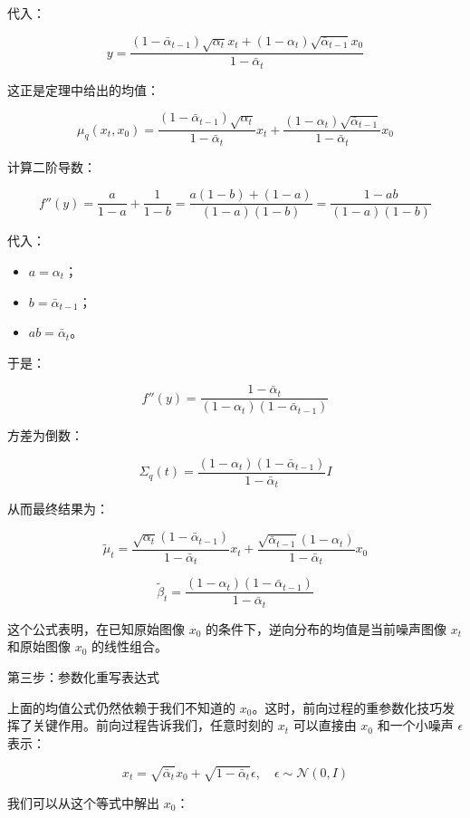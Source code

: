 代入：

\[
y=\frac{(1-\bar{\alpha}_{t-1})\sqrt{\alpha_t}x_t+(1-\alpha_t)\sqrt{\bar{\alpha}_{t-1}}x_0}{1-\bar{\alpha}_t}
\]

这正是定理中给出的均值：

\[
\mu_q(x_t,x_0)=
\frac{(1-\bar{\alpha}_{t-1})\sqrt{\alpha_t}}{1-\bar{\alpha}_t}x_t
+\frac{(1-\alpha_t)\sqrt{\bar{\alpha}_{t-1}}}{1-\bar{\alpha}_t}x_0
\]

计算二阶导数：

\[
f''(y)=\frac{a}{1-a}+\frac{1}{1-b}
=\frac{a(1-b)+(1-a)}{(1-a)(1-b)}
=\frac{1-ab}{(1-a)(1-b)}
\]

代入：

\begin{itemize}
\tightlist
\item
  \(a=\alpha_t\)；
\item
  \(b=\bar{\alpha}_{t-1}\)；
\item
  \(ab=\bar{\alpha}_t\)。
\end{itemize}

于是：

\[
f''(y)=\frac{1-\bar{\alpha}_t}{(1-\alpha_t)(1-\bar{\alpha}_{t-1})}
\]

方差为倒数：

\[
\Sigma_q(t)=\frac{(1-\alpha_t)(1-\bar{\alpha}_{t-1})}{1-\bar{\alpha}_t}I
\]

从而最终结果为：

\[
\tilde{\mu}_t=
\frac{\sqrt{\alpha_t}(1-\bar{\alpha}_{t-1})}{1-\bar{\alpha}_t}x_t
+\frac{\sqrt{\bar{\alpha}_{t-1}}(1-\alpha_t)}{1-\bar{\alpha}_t}x_0
\]

\[
\tilde{\beta}_t=\frac{(1-\alpha_t)(1-\bar{\alpha}_{t-1})}{1-\bar{\alpha}_t}
\]

这个公式表明，在已知原始图像 \(x_0\) 的条件下，逆向分布的均值是当前噪声图像 \(x_t\) 和原始图像 \(x_0\) 的线性组合。

第三步：参数化重写表达式

上面的均值公式仍然依赖于我们不知道的 \(x_0\)。这时，前向过程的重参数化技巧发挥了关键作用。前向过程告诉我们，任意时刻的 \(x_t\) 可以直接由 \(x_0\) 和一个小噪声 \(\epsilon\) 表示：

\[
x_t=\sqrt{\bar{\alpha}_t}x_0+\sqrt{1-\bar{\alpha}_t}\epsilon,\quad \epsilon\sim\mathcal{N}(0,I)
\]

我们可以从这个等式中解出 \(x_0\)：

